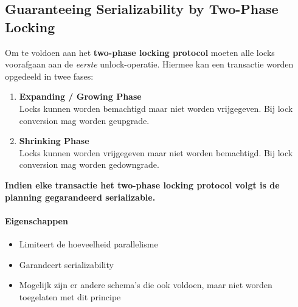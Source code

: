 \subsection{Guaranteeing Serializability by Two-Phase Locking}%
Om te voldoen aan het \textbf{two-phase locking protocol} moeten alle locks voorafgaan aan de \textit{eerste} unlock-operatie. Hiermee kan een transactie worden opgedeeld in twee fases:
\begin{enumerate}
	\item \textbf{Expanding / Growing Phase} \\ Locks kunnen worden bemachtigd maar niet worden vrijgegeven. Bij lock conversion mag worden geupgrade.
	\item \textbf{Shrinking Phase} \\ Locks kunnen worden vrijgegeven maar niet worden bemachtigd. Bij lock conversion mag worden gedowngrade.
\end{enumerate}

\begin{center}
\textbf{Indien elke transactie het two-phase locking protocol volgt is de planning gegarandeerd serializable.}
\end{center}

\paragraph{Eigenschappen}
\begin{itemize}
	\item Limiteert de hoeveelheid parallelisme
	\item Garandeert serializability
	\item Mogelijk zijn er andere schema's die ook voldoen, maar niet worden toegelaten met dit principe
\end{itemize}

